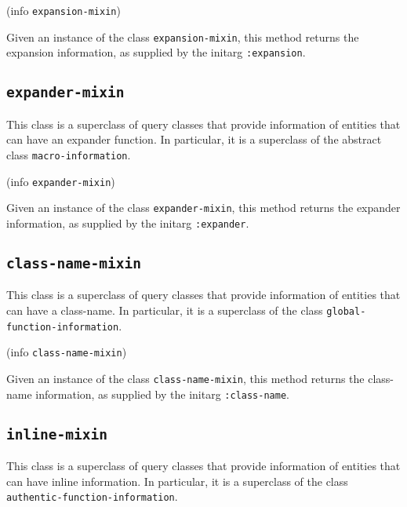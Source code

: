 
 {(info {\tt expansion-mixin})}

Given an instance of the class \texttt{expansion-mixin}, this method
returns the expansion information, as supplied by the initarg
\texttt{:expansion}.

\subsection{\texttt{expander-mixin}}
\label{sec-expander-mixin}

This class is a superclass of query classes that provide information
of entities that can have an expander function.  In particular, it is
a superclass of the abstract class \texttt{macro-information}.


 {(info {\tt expander-mixin})}

Given an instance of the class \texttt{expander-mixin}, this method
returns the expander information, as supplied by the initarg
\texttt{:expander}.

\subsection{\texttt{class-name-mixin}}
\label{sec-class-name-mixin}

This class is a superclass of query classes that provide information
of entities that can have a class-name.  In particular, it is a
superclass of the class \texttt{global-function-information}.


 {(info {\tt class-name-mixin})}

Given an instance of the class \texttt{class-name-mixin}, this method
returns the class-name information, as supplied by the initarg
\texttt{:class-name}.

\subsection{\texttt{inline-mixin}}
\label{sec-inline-mixin}

This class is a superclass of query classes that provide information
of entities that can have inline information.  In particular, it is a
superclass of the class \texttt{authentic-function-information}.


